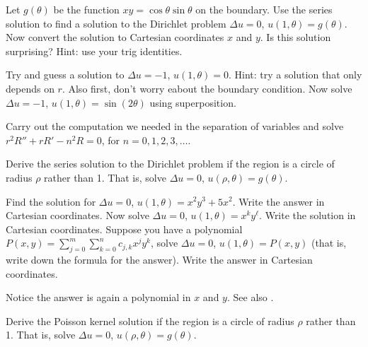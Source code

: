 \documentclass{ximera}
\begin{document}
\begin{exercise} \label{exercise:dirichproblemxy}
    Let $g(\theta)$ be the function $xy = \cos \theta \sin \theta$ on the boundary.  Use the series solution to find a solution to the Dirichlet problem $\Delta u = 0$, $u(1,\theta) = g(\theta)$.  Now convert the solution to Cartesian coordinates $x$ and $y$.  Is this solution surprising?  Hint: use your trig identities.
\end{exercise}

\begin{exercise}%
    \begin{tasks}
        \task Try and guess a solution to $\Delta u = -1$, $u(1,\theta) = 0$. Hint: try a solution that only depends on $r$.  Also first, don't worry eabout the boundary condition.
        \task Now solve $\Delta u = -1$, $u(1,\theta) = \sin(2\theta)$ using superposition.
    \end{tasks}
\end{exercise}

\begin{exercise}
    Carry out the computation we needed in the separation of variables and solve $r^2 R'' + r R' - n^2 R = 0$, for $n=0,1,2,3,\ldots$.
\end{exercise}

\begin{exercise}%
    Derive the series solution to the Dirichlet problem if the region is a circle of radius $\rho$ rather than 1. That is, solve $\Delta u = 0$, $u(\rho,\theta) = g(\theta)$. 
\end{exercise}

\begin{exercise}%
    \begin{tasks}
        \task Find the solution for $\Delta u = 0$, $u(1,\theta) = x^2y^3 + 5 x^2$.  Write the answer in Cartesian coordinates.
        \task Now solve $\Delta u = 0$, $u(1,\theta) = x^k y^\ell$. Write the solution in Cartesian coordinates.
        \task Suppose you have a polynomial $P(x,y) = \sum_{j=0}^m \sum_{k=0}^n c_{j,k} x^j y^k$, solve $\Delta u = 0$, $u(1,\theta) = P(x,y)$ (that is, write down the formula for the answer).  Write the answer in Cartesian coordinates.
    \end{tasks}
        Notice the answer is again a polynomial in $x$ and $y$. See also .
\end{exercise}

\begin{exercise}%
    Derive the Poisson kernel solution if the region is a circle of radius $\rho$ rather than 1.  That is, solve $\Delta u = 0$, $u(\rho,\theta) = g(\theta)$.
\end{exercise}
%
\end{document}
